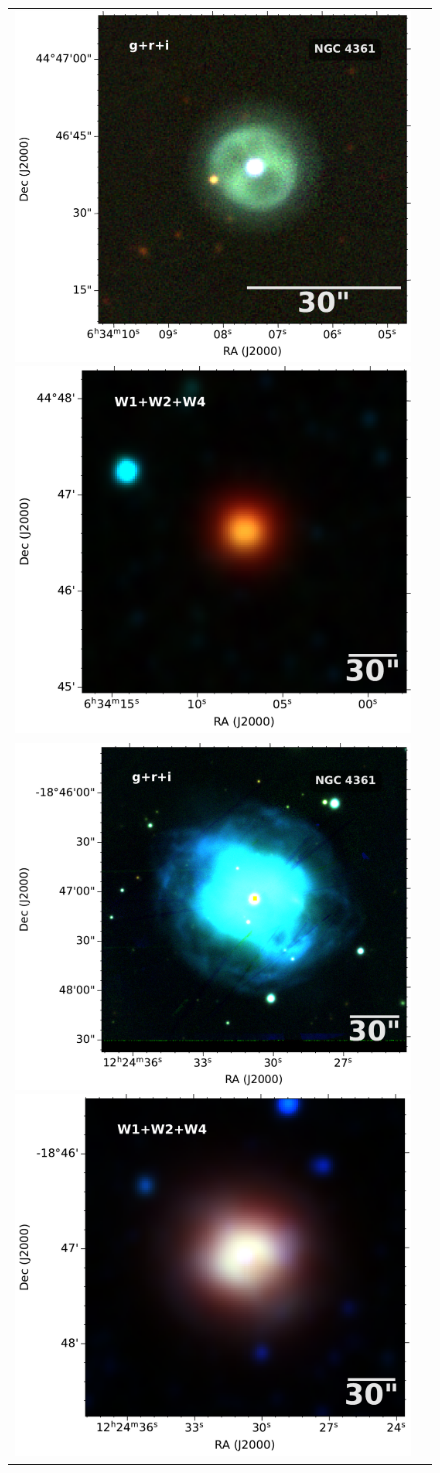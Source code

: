 \documentclass[fleqn,usenatbib]{mnras}
\begin{document}
{\begin{figure}
  \centering
  \begin{tabular}{l l}
\includegraphics[width=0.52\linewidth]{Figs/cutout_rings.v3.skycell.2243.029.stk.i.unconv-irg-RGB.pdf}
\includegraphics[width=0.5\linewidth]{Figs/0979p454_ac51-w4-int-3_ra98.53061791727998_dec44.77716333248_asec200.000-421-RGB.pdf}\\
\includegraphics[width=0.52\linewidth]{Figs/cutout_rings.v3.skycell.0924.030.stk.i.unconv-irg-RGB.pdf}
\includegraphics[width=0.5\linewidth]{Figs/1855m182_ac51-w4-int-3_ra186.12812938647002_dec-18.78487981564_asec200.000-421-RGB}\\

\end{tabular}
\end{figure}}
\end{document}
